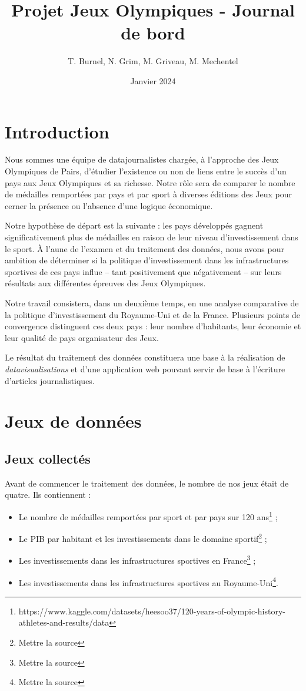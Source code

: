\documentclass[hidelinks, 12pt]{article}
\title{Projet Jeux Olympiques - Journal de bord}
\date{Janvier 2024}
\author{T. Burnel, N. Grim, M. Griveau, M. Mechentel}
\begin{document}
	\maketitle
	
	\section{Introduction}
	
	Nous sommes une équipe de datajournalistes chargée, à l'approche des Jeux Olympiques de Pairs, d'étudier l'existence ou non de liens entre le succès d'un pays aux Jeux Olympiques et sa richesse. Notre rôle sera de comparer le nombre de médailles remportées par pays et par sport à diverses éditions des Jeux pour cerner la présence ou l'absence d'une logique économique.
	
	Notre hypothèse de départ est la suivante : les pays développés gagnent significativement plus de médailles en raison de leur niveau d'investissement dans le sport. À l’aune de l’examen et du traitement des données, nous avons pour ambition de déterminer si la politique d’investissement dans les infrastructures sportives de ces pays influe -- tant positivement que négativement -- sur leurs résultats aux différentes épreuves des Jeux Olympiques.
	
	Notre travail consistera, dans un deuxième temps, en une analyse comparative de la politique d'investissement du Royaume-Uni et de la France. Plusieurs points de convergence distinguent ces deux pays : leur nombre d'habitants, leur économie et leur qualité de pays organisateur des Jeux.
	
	Le résultat du traitement des données constituera une base à la réalisation de \emph{datavisualisations} et d'une application web pouvant servir de base à l'écriture d'articles journalistiques.
	
	
	\section{Jeux de données}
	
		\subsection{Jeux collectés}
		
		Avant de commencer le traitement des données, le nombre de nos jeux était de quatre. Ils contiennent :
		\begin{itemize}
			\item Le nombre de médailles remportées par sport et par pays sur 120 ans\footnote{https://www.kaggle.com/datasets/heesoo37/120-years-of-olympic-history-athletes-and-results/data} ;
			\item Le PIB par habitant et les investissements dans le domaine sportif\footnote{Mettre la source} ;
			\item Les investissements dans les infrastructures sportives en France\footnote{Mettre la source} ;
			\item Les investissements dans les infrastructures sportives au Royaume-Uni\footnote{Mettre la source}.
		\end{itemize}
\end{document}
